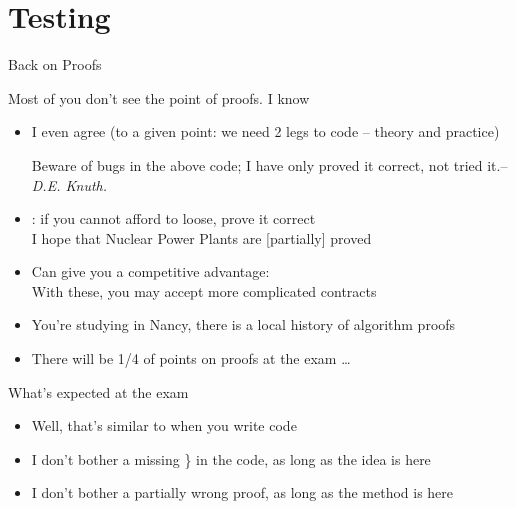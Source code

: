 \part{Testing}\mypartpage
\begin{frame}{Back on Proofs}
  \begin{block}{Most of you don't see the point of proofs. I know}
    \begin{itemize}
    \item I even agree (to a given point: we need 2 legs to code -- theory and practice)
      \begin{boitequote}{}
        Beware of bugs in the above code; I have only proved it correct, not
        tried it.\hfill -- \emph{D.E. Knuth.}
      \end{boitequote}

    \item {}: if you cannot afford to loose, prove it correct\\
      {\small I hope that Nuclear Power Plants are [partially] proved}
    \item Can give you a competitive advantage:\\
      With these, you may accept more complicated contracts
    \item You're studying in Nancy, there is a local history of algorithm proofs
    \item There will be 1/4 of points on proofs at the exam \ldots
    \end{itemize}
  \end{block}

  \begin{block}{What's expected at the exam}
    \begin{itemize}
    \item Well, that's similar to when you write code
    \item I don't bother a missing \} in the code, as long as the idea is here
    \item I don't bother a partially wrong proof, as long as the method is here
    \end{itemize}
  \end{block}

\end{frame}
